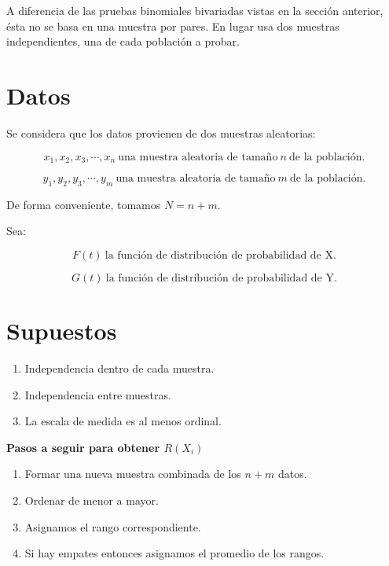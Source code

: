 \documentclass[
  a4paper,
  oneside,
  openany]{book}
\begin{document}
A diferencia de las pruebas binomiales bivariadas vistas en la sección anterior, ésta no se basa en una muestra por pares. En lugar usa dos muestras independientes, una de cada población a probar.

\hypertarget{datos-5}{%
\section{Datos}\label{datos-5}}

Se considera que los datos provienen de dos muestras aleatorias:

\[x_{1},x_{2},x_{3},\cdots,x_{n} \ \mbox{una muestra aleatoria de tamaño} \ n \ \mbox{de la población.}\]

\[y_{1},y_{2},y_{3},\cdots,y_{m} \ \mbox{una muestra aleatoria de tamaño} \  m \  \mbox{de la población.}\]

De forma conveniente, tomamos \(N=n+m\).

Sea:

\[F(t) \ \mbox{la función de distribución de probabilidad de X.}\]

\[G(t) \ \mbox{la función de distribución de probabilidad de Y.}\]

\hypertarget{supuestos-5}{%
\section{Supuestos}\label{supuestos-5}}

\begin{enumerate}
\def\labelenumi{\arabic{enumi})}
\item
  Independencia dentro de cada muestra.
\item
  Independencia entre muestras.
\item
  La escala de medida es al menos ordinal.
\end{enumerate}

\textbf{Pasos a seguir para obtener \(R(X_{i})\)}

\begin{enumerate}
\def\labelenumi{\arabic{enumi}.}
\item
  Formar una nueva muestra combinada de los \(n+m\) datos.
\item
  Ordenar de menor a mayor.
\item
  Asignamos el rango correspondiente.
\item
  Si hay empates entonces asignamos el promedio de los rangos.
\end{enumerate}
\end{document}
